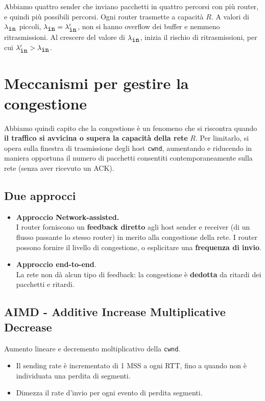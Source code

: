 Abbiamo quattro sender che inviano pacchetti in quattro percorsi con più router, e quindi più possibili percorsi. Ogni router trasmette a capacità $R$. A valori di $\lambda_{\verb|in|}$ piccoli, $\lambda_{\verb|in|} = \lambda_{\verb|in|}'$, non si hanno overflow dei buffer e nemmeno ritrasmissioni. Al crescere del valore di $\lambda_{\verb|in|}$, inizia il rischio di ritrasmissioni, per cui $\lambda_{\verb|in|}' > \lambda_{\verb|in|}$.

\newpage

\section{Meccanismi per gestire la congestione}
Abbiamo quindi capito che la congestione è un fenomeno che si riscontra quando \textbf{il traffico si avvicina o supera la capacità della rete} $R$. Per limitarlo, si opera sulla finestra di trasmissione degli host \verb|cwnd|, aumentando e riducendo in maniera opportuna il numero di pacchetti consentiti contemporaneamente sulla rete (senza aver ricevuto un ACK).
\subsection{Due approcci}
\begin{itemize}
	\item \textbf{Approccio Network-assisted.}\\
	I router forniscono un \textbf{feedback diretto} agli host sender e receiver (di un flusso passante lo stesso router) in merito alla congestione della rete. I router possono fornire il livello di congestione, o esplicitare una \textbf{frequenza di invio}.
	
	\item \textbf{Approccio end-to-end}.\\
	La rete non dà alcun tipo di feedback: la congestione è \textbf{dedotta} da ritardi dei pacchetti e ritardi.
\end{itemize}

\subsection{AIMD - Additive Increase Multiplicative Decrease}
Aumento lineare e decremento moltiplicativo della \verb|cwnd|.
\begin{itemize}
	\item Il sending rate è incrementato di 1 MSS a ogni RTT, fino a quando non è individuata una perdita di segmenti.
	\item Dimezza il rate d'invio per ogni evento di perdita segmenti.
\end{itemize}

